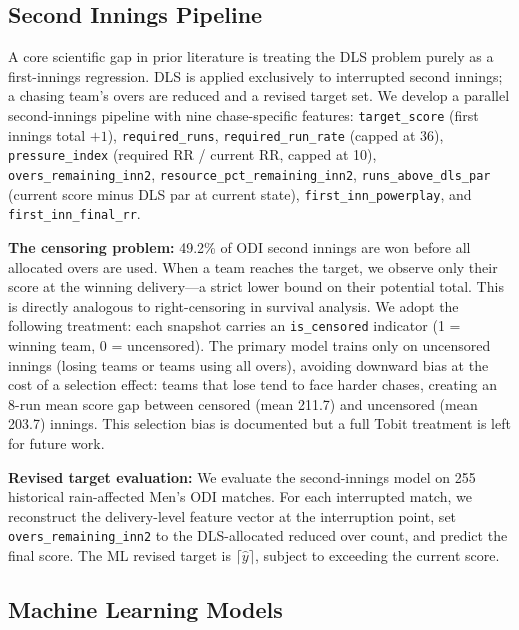 \documentclass[10pt,a4paper,twocolumn]{article}
\begin{document}
\subsection{Second Innings Pipeline}
\label{sec:second_innings}

A core scientific gap in prior literature is treating the DLS problem purely as a first-innings regression. DLS is applied exclusively to interrupted second innings; a chasing team's overs are reduced and a revised target set. We develop a parallel second-innings pipeline with nine chase-specific features: \texttt{target\_score} (first innings total $+1$), \texttt{required\_runs}, \texttt{required\_run\_rate} (capped at 36), \texttt{pressure\_index} (required RR / current RR, capped at 10), \texttt{overs\_remaining\_inn2}, \texttt{resource\_pct\_remaining\_inn2}, \texttt{runs\_above\_dls\_par} (current score minus DLS par at current state), \texttt{first\_inn\_powerplay}, and \texttt{first\_inn\_final\_rr}.

\textbf{The censoring problem:} 49.2\% of ODI second innings are won before all allocated overs are used. When a team reaches the target, we observe only their score at the winning delivery---a strict lower bound on their potential total. This is directly analogous to right-censoring in survival analysis. We adopt the following treatment: each snapshot carries an \texttt{is\_censored} indicator (1 = winning team, 0 = uncensored). The primary model trains only on uncensored innings (losing teams or teams using all overs), avoiding downward bias at the cost of a selection effect: teams that lose tend to face harder chases, creating an 8-run mean score gap between censored (mean 211.7) and uncensored (mean 203.7) innings. This selection bias is documented but a full Tobit treatment is left for future work.

\textbf{Revised target evaluation:} We evaluate the second-innings model on 255 historical rain-affected Men's ODI matches. For each interrupted match, we reconstruct the delivery-level feature vector at the interruption point, set \texttt{overs\_remaining\_inn2} to the DLS-allocated reduced over count, and predict the final score. The ML revised target is $\lceil \hat{y} \rceil$, subject to exceeding the current score.

\subsection{Machine Learning Models}
\label{sec:models}
\end{document}
